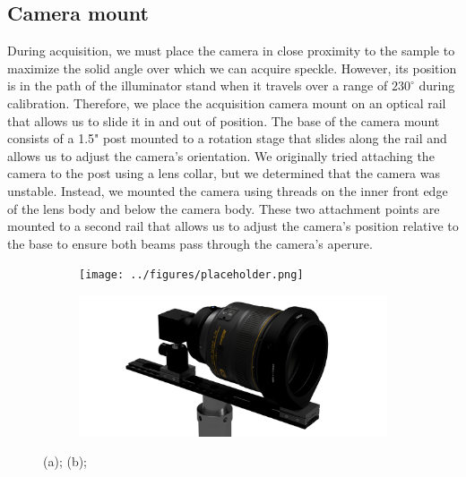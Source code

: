 \subsection{Camera mount}
During acquisition, we must place the camera in close proximity to the sample to maximize the solid angle over which we can acquire speckle. However, its position is in the path of the illuminator stand when it travels over a range of $230^\circ$ during calibration. Therefore, we place the acquisition camera mount on an optical rail that allows us to slide it in and out of position. The base of the camera mount consists of a 1.5" post mounted to a rotation stage that slides along the rail and allows us to adjust the camera's orientation. We originally tried attaching the camera to the post using a lens collar, but we determined that the camera was unstable. Instead, we mounted the camera using threads on the inner front edge of the lens body and below the camera body. These two attachment points are mounted to a second rail that allows us to adjust the camera's position relative to the base to ensure both beams pass through the camera's aperure.

\begin{figure}
    \centering
    \begin{subfigure}{0.49\textwidth}
        \centering
        \texttt{[image: ../figures/placeholder.png]}
        \caption{}
        \label{fig:acq_cam_mount_real}
    \end{subfigure}
    \begin{subfigure}{0.49\textwidth}
        \centering
        \includegraphics[trim={0 0 0 0}, clip, width=\textwidth]{../figures/Acquisition_Camera_Mount.png}
        \caption{}
        \label{fig:acq_cam_mount_cad}
    \end{subfigure}
    \caption{(a); (b);}
    \label{fig:aca_cam_mount}
\end{figure}

